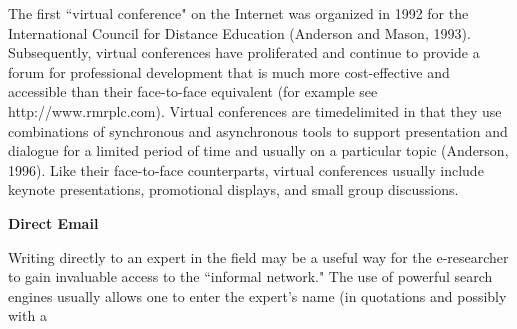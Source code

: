 \documentclass{article}
\begin{document}
The first “virtual conference" on the Internet was organized in 1992 for the International Council for Distance Education (Anderson and Mason, 1993). Subsequently, virtual conferences have proliferated and continue to provide a forum for professional development that is much more cost-effective and accessible than their face-to-face
equivalent (for example see http://www.rmrplc.com). Virtual conferences are timedelimited in that they use combinations of synchronous and asynchronous tools to support presentation and dialogue for a limited period of time and usually on a particular topic (Anderson, 1996). Like their face-to-face counterparts, virtual conferences usually include keynote presentations, promotional displays, and small group discussions.

\vspace{5mm}
\hspace{-2cm}
\textbf{Direct Email}
\vspace{5mm}

Writing directly to an expert in the field may be a useful way for the e-researcher to gain invaluable access to the “informal network." The use of powerful search engines usually allows one to enter the expert's name (in quotations and possibly with a
\end{document}
